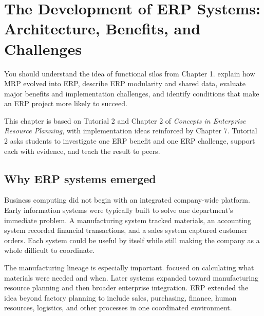 \chapter{The Development of ERP Systems: Architecture, Benefits, and Challenges}
\label{ch:erp-development}

\chapterguide
  {You should understand the idea of functional silos from Chapter 1.}
  {explain how MRP evolved into ERP, describe ERP modularity and shared data, evaluate major benefits and implementation challenges, and identify conditions that make an ERP project more likely to succeed.}

\begin{sourcebasis}
This chapter is based on Tutorial 2 and Chapter 2 of \emph{Concepts in Enterprise Resource Planning}, with implementation ideas reinforced by Chapter 7. Tutorial 2 asks students to investigate one ERP benefit and one ERP challenge, support each with evidence, and teach the result to peers.
\end{sourcebasis}

\section{Why ERP systems emerged}

Business computing did not begin with an integrated company-wide platform. Early information systems were typically built to solve one department's immediate problem. A manufacturing system tracked materials, an accounting system recorded financial transactions, and a sales system captured customer orders. Each system could be useful by itself while still making the company as a whole difficult to coordinate.

The manufacturing lineage is especially important.  focused on calculating what materials were needed and when. Later systems expanded toward manufacturing resource planning and then broader enterprise integration. ERP extended the idea beyond factory planning to include sales, purchasing, finance, human resources, logistics, and other processes in one coordinated environment.

\begin{erpfigure}
\end{erpfigure}

